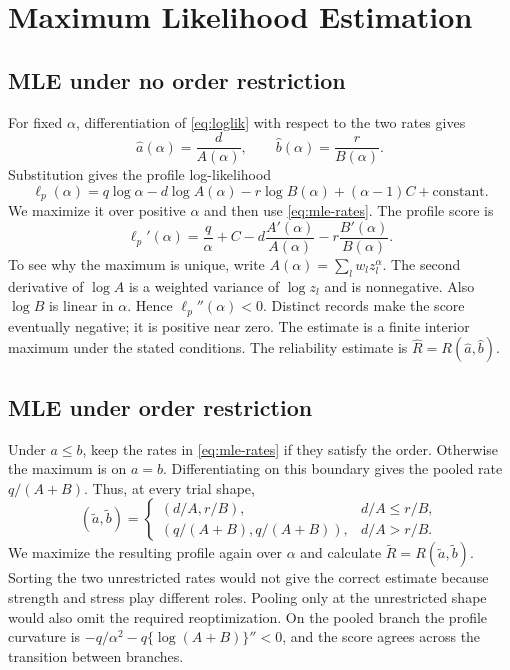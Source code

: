\documentclass[a4paper,11pt]{article}
\begin{document}
\section{Maximum Likelihood Estimation}\label{sec:mle}
\subsection{MLE under no order restriction}\label{sec:unrestricted-mle}
For fixed $\alpha$, differentiation of \eqref{eq:loglik} with respect to the two rates gives
\begin{equation}
\widehat a(\alpha)=\frac{d}{A(\alpha)},\qquad \widehat b(\alpha)=\frac{r}{B(\alpha)}.\label{eq:mle-rates}
\end{equation}
Substitution gives the profile log-likelihood
\begin{equation}
\ell_p(\alpha)=q\log\alpha-d\log A(\alpha)-r\log B(\alpha)+(\alpha-1)C+\text{constant}.\label{eq:profile}
\end{equation}
We maximize it over positive $\alpha$ and then use \eqref{eq:mle-rates}. The profile score is
\begin{equation}
\ell_p'(\alpha)=\frac q\alpha+C-d\frac{A'(\alpha)}{A(\alpha)}-r\frac{B'(\alpha)}{B(\alpha)}.\label{eq:profile-score}
\end{equation}
To see why the maximum is unique, write $A(\alpha)=\sum_lw_lz_l^\alpha$. The second derivative of $\log A$ is a weighted variance of $\log z_l$ and is nonnegative. Also $\log B$ is linear in $\alpha$. Hence $\ell_p''(\alpha)<0$. Distinct records make the score eventually negative; it is positive near zero. The estimate is a finite interior maximum under the stated conditions. The reliability estimate is $\widehat R=R(\widehat a,\widehat b)$.

\subsection{MLE under order restriction}\label{sec:ordered-mle}
Under $a\le b$, keep the rates in \eqref{eq:mle-rates} if they satisfy the order. Otherwise the maximum is on $a=b$. Differentiating on this boundary gives the pooled rate $q/(A+B)$. Thus, at every trial shape,
\begin{equation}
(\widetilde a,\widetilde b)=
\begin{cases}
(d/A,r/B),& d/A\le r/B,\\
(q/(A+B),q/(A+B)),&d/A>r/B.
\end{cases}\label{eq:ordered-rates}
\end{equation}
We maximize the resulting profile again over $\alpha$ and calculate $\widetilde R=R(\widetilde a,\widetilde b)$. Sorting the two unrestricted rates would not give the correct estimate because strength and stress play different roles. Pooling only at the unrestricted shape would also omit the required reoptimization. On the pooled branch the profile curvature is $-q/\alpha^2-q\{\log(A+B)\}''<0$, and the score agrees across the transition between branches.
\end{document}
